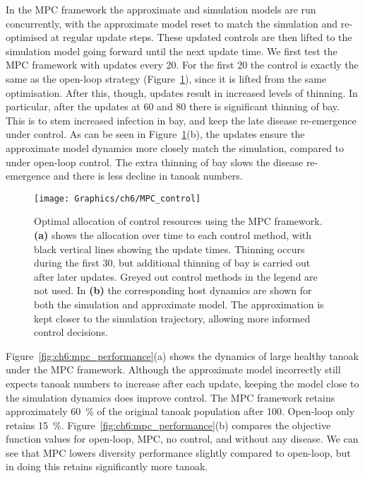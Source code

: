 In the MPC framework the approximate and simulation models are run concurrently, with the approximate model reset to match the simulation and re-optimised at regular update steps. These updated controls are then lifted to the simulation model going forward until the next update time. We first test the MPC framework with updates every \SI{20}{\years}. For the first \SI{20}{\years} the control is exactly the same as the open-loop strategy (Figure~\ref{fig:ch6:mpc_strat}), since it is lifted from the same optimisation. After this, though, updates result in increased levels of thinning. In particular, after the updates at 60 and \SI{80}{\years} there is significant thinning of bay. This is to stem increased infection in bay, and keep the late disease re-emergence under control. As can be seen in Figure~\ref{fig:ch6:mpc_strat}(b), the updates ensure the approximate model dynamics more closely match the simulation, compared to under open-loop control. The extra thinning of bay slows the disease re-emergence and there is less decline in tanoak numbers.

\begin{figure}[!t]
    \begin{center}
        \texttt{[image: Graphics/ch6/MPC\_control]}
        \caption[MPC control strategy]{Optimal allocation of control resources using the MPC framework. \textbf{(a)} shows the allocation over time to each control method, with black vertical lines showing the update times. Thinning occurs during the first \SI{30}{\years}, but additional thinning of bay is carried out after later updates. Greyed out control methods in the legend are not used. In \textbf{(b)} the corresponding host dynamics are shown for both the simulation and approximate model. The approximation is kept closer to the simulation trajectory, allowing more informed control decisions.\label{fig:ch6:mpc_strat}}
    \end{center}
\end{figure}

Figure~\ref{fig:ch6:mpc_performance}(a) shows the dynamics of large healthy tanoak under the MPC framework. Although the approximate model incorrectly still expects tanoak numbers to increase after each update, keeping the model close to the simulation dynamics does improve control. The MPC framework retains approximately \SI{60}{\percent} of the original tanoak population after \SI{100}{\years}. Open-loop only retains \SI{15}{\percent}. Figure~\ref{fig:ch6:mpc_performance}(b) compares the objective function values for open-loop, MPC, no control, and without any disease. We can see that MPC lowers diversity performance slightly compared to open-loop, but in doing this retains significantly more tanoak.

